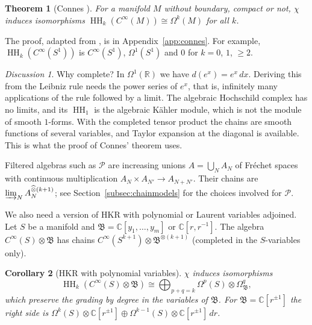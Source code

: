 \documentclass[11pt,oneside,reqno]{article}
\DeclareMathOperator{\HH}{HH}
\newcommand{\C}{\mathbb C}
\newcommand{\R}{\mathbb R}
\newcommand{\cP}{\mathcal P}
\newcommand{\CI}{C^\infty}
\newcommand{\Om}{\Omega}
\newcommand{\hot}{\mathbin{\widehat\otimes}}
\theoremstyle{plain}
\newtheorem{theorem}{Theorem}[section]
\newtheorem{corollary}[theorem]{Corollary}
\theoremstyle{definition}
\theoremstyle{remark}
\newtheorem*{discussion}{Discussion}
\begin{document}
\begin{theorem}[Connes \cite{Connes}]\label{thm:connes}
For a manifold \(M\) without boundary, compact or not, \(\chi\) induces
isomorphisms \(\HH_k(\CI(M))\cong\Om^k(M)\) for all \(k\).
\end{theorem}

The proof, adapted from \cite{Connes,MelroseMicro}, is in
Appendix~\ref{app:connes}. For example, \(\HH_k(\CI(S^1))\) is \(\CI(S^1)\),
\(\Om^1(S^1)\) and \(0\) for \(k=0\), \(1\), \(\ge2\).

\begin{discussion}
Why complete? In \(\Om^1(\R)\) we have \(d(e^x)=e^x\,dx\). Deriving this from
the Leibniz rule needs the power series of \(e^x\), that is, infinitely many
applications of the rule followed by a limit. The algebraic Hochschild
complex has no limits, and its \(\HH_1\) is the algebraic Kähler module, which
is not the module of smooth \(1\)-forms. With the completed tensor product
the chains are smooth functions of several variables, and Taylor expansion
at the diagonal is available. This is what the proof of Connes' theorem
uses.
\end{discussion}

Filtered algebras such as \(\cP\) are increasing unions \(A=\bigcup_NA_N\) of
Fréchet spaces with continuous multiplication \(A_N\times A_{N'}\to A_{N+N'}\).
Their chains are \(\varinjlim_NA_N^{\hot(k+1)}\); see
Section~\ref{subsec:chainmodels} for the choices involved for \(\cP\).

We also need a version of HKR with polynomial or Laurent variables
adjoined. Let \(S\) be a manifold and \(\mathfrak B=\C[y_1,\dots,y_m]\) or
\(\C[r,r^{-1}]\). The algebra \(\CI(S)\otimes\mathfrak B\) has chains
\(\CI(S^{k+1})\otimes\mathfrak B^{\otimes(k+1)}\) (completed in the
\(S\)-variables only).

\begin{corollary}[HKR with polynomial variables]\label{cor:HKRpoly}
\(\chi\) induces isomorphisms
\[
 \HH_k(\CI(S)\otimes\mathfrak B)\cong\bigoplus_{p+q=k}\Om^p(S)\otimes\Om^q_{\mathfrak B},
\]
which preserve the grading by degree in the variables of \(\mathfrak B\).
For \(\mathfrak B=\C[r^{\pm1}]\) the right side is
\(\Om^k(S)\otimes\C[r^{\pm1}]\oplus\Om^{k-1}(S)\otimes\C[r^{\pm1}]\,dr\).
\end{corollary}
\end{document}
